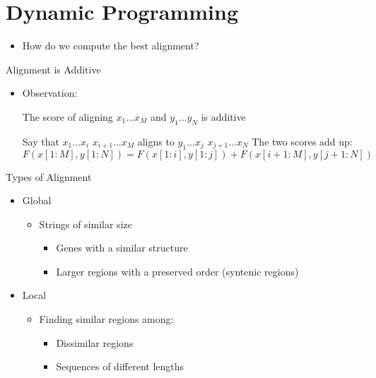 \documentclass{bredelebeamer}
\begin{document}
 \section{Dynamic Programming}
  \begin{frame}{}
    \tableofcontents[currentsection]
\end{frame}
 \begin{frame}{}
    \large{
    \begin{itemize}
 \item How do we compute the best alignment?
   \end{itemize} 
   
    }  
 \end{frame}
  \begin{frame}{Alignment is Additive}
   
    \begin{itemize}
 \item Observation:

 \par The score of aligning $x_1...x_M$ and $y_1...y_N$ is additive
 \newline 
\par
   Say that \quad $x_1...x_i$ \quad $x_{i+1}...x_M$ \linebreak \quad aligns to \quad $y_1...x_j$ \quad $x_{j+1}...x_N$
   \newline
    \newline
    The two scores add up:
    \quad
   $$F(x[1:M], y[1:N]) = F(x[1:i], y[1:j]) + F(x[i+1:M], y[j+1:N])$$
   
   \end{itemize} 
 \end{frame}
 \begin{frame}{Types of Alignment}
    \begin{itemize}
 \item Global
          \begin{itemize}
     \item Strings of similar size
      \begin{itemize}
     \item Genes with a similar structure
     \item Larger regions with a preserved order (syntenic
regions)
   \end{itemize} 
   \end{itemize} 
   \item Local
    \begin{itemize}
     \item Finding similar regions among:
      \begin{itemize}
     \item Dissimilar regions
     \item Sequences of different lengths
   \end{itemize} 
   \end{itemize}
   \end{itemize}  
 \end{frame}
\end{document}
